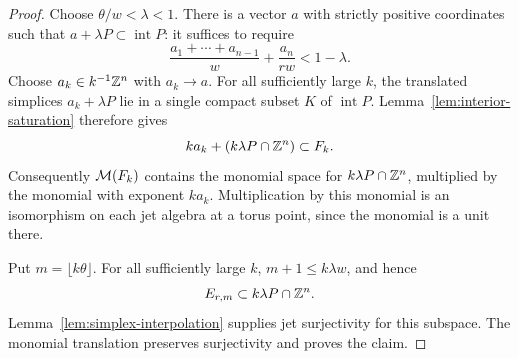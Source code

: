 \begin{proof}
Choose $\theta/w<\lambda<1$. There is a vector $a$ with strictly positive
coordinates such that $a+\lambda P\subset\operatorname{int}P$: it suffices
to require
\[
 \frac{a_1+\cdots+a_{n-1}}w+\frac{a_n}{rw}<1-\lambda.
\]
Choose $a_k\in k^{-1}\mathbb Z^n$ with $a_k\to a$. For all sufficiently large
$k$, the translated simplices $a_k+\lambda P$ lie in a single compact
subset $K$ of $\operatorname{int}P$. Lemma~\ref{lem:interior-saturation}
therefore gives
\[
 ka_k+(k\lambda P\cap\mathbb Z^n)\subset F_k.
\]
Consequently $\mathcal M(F_k)$ contains the monomial space for
$k\lambda P\cap\mathbb Z^n$, multiplied by the monomial with exponent $ka_k$.
Multiplication by this monomial is an isomorphism on each jet algebra at
a torus point, since the monomial is a unit there.

Put $m=\lfloor k\theta\rfloor$. For all sufficiently large $k$,
$m+1\le k\lambda w$, and hence
\[
 E_{r,m}\subset k\lambda P\cap\mathbb Z^n.
\]
Lemma~\ref{lem:simplex-interpolation} supplies jet surjectivity for this
subspace. The monomial translation preserves surjectivity and proves the
claim.
\end{proof}
